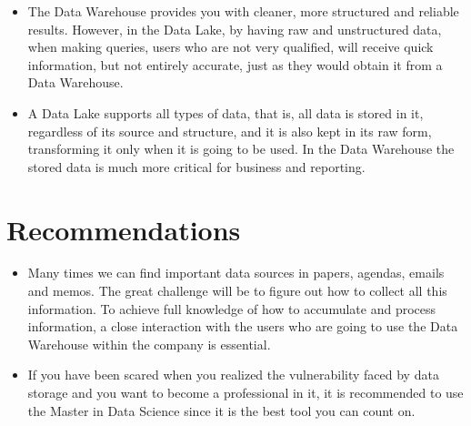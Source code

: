 \documentclass{article}
\begin{document}
\begin{multicols}{2}
\begin{itemize}
    \item The Data Warehouse provides you with cleaner, more structured and reliable results. However, in the Data Lake, by having raw and unstructured data, when making queries, users who are not very qualified, will receive quick information, but not entirely accurate, just as they would obtain it from a Data Warehouse.
    
    \item A Data Lake supports all types of data, that is, all data is stored in it, regardless of its source and structure, and it is also kept in its raw form, transforming it only when it is going to be used. In the Data Warehouse the stored data is much more critical for business and reporting.

    
\end{itemize}
 

\section{Recommendations}
\begin{itemize}
    \item Many times we can find important data sources in papers, agendas, emails and memos. The great challenge will be to figure out how to collect all this information. To achieve full knowledge of how to accumulate and process information, a close interaction with the users who are going to use the Data Warehouse within the company is essential.
    
    \item If you have been scared when you realized the vulnerability faced by data storage and you want to become a professional in it, it is recommended to use the Master in Data Science since it is the best tool you can count on.

    
\end{itemize}
\end{multicols}
\newpage
\end{document}
